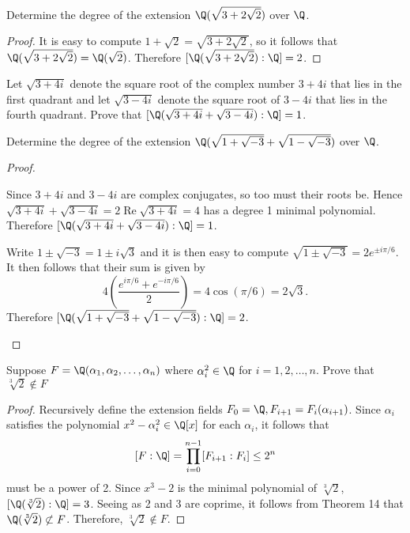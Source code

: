 \documentclass[10pt]{amsart}
\begin{document}
\begin{thm}
  \label{Ex3}
  Determine the degree of the extension $\Q(\sqrt{3 + 2\sqrt{2}})$ over $\Q$.
  
  \begin{proof}
    It is easy to compute $1 + \sqrt{2} = \sqrt{3 + 2\sqrt{2}}$, so it follows that $\Q(\sqrt{3 + 2\sqrt{2}}) = \Q(\sqrt{2})$.
    Therefore $[\Q(\sqrt{3 + 2\sqrt{2}}):\Q] = 2$.
  \end{proof}

  \begin{alphaenum}
    \item
      Let $\sqrt{3 + 4i}$ denote the square root of the complex number $3 + 4i$ that lies in the first quadrant and let $\sqrt{3 - 4i}$ denote the square root of $3 - 4i$ that lies in the fourth quadrant.
      Prove that $[\Q(\sqrt{3 + 4i} + \sqrt{3 - 4i}): \Q] = 1$.
    \item
      Determine the degree of the extension $\Q(\sqrt{1 + \sqrt{-3}} + \sqrt{1 - \sqrt{-3}})$ over $\Q$.
  \end{alphaenum}
  
  \begin{proof}
    \begin{alphaenum}
    \item
      Since $3 + 4i$ and $3 - 4i$ are complex conjugates, so too must their roots be.
      Hence $\sqrt{3 + 4i} + \sqrt{3 - 4i} = 2\operatorname{Re}{\sqrt{3+4i}} = 4$ has a degree 1 minimal polynomial.
      Therefore $[\Q(\sqrt{3 + 4i} + \sqrt{3 - 4i}): \Q] = 1$.
    \item
      Write $1 \pm \sqrt{-3} = 1 \pm i\sqrt{3}$ and it is then easy to compute $\sqrt{1 \pm \sqrt{-3}} = 2e^{\pm i\pi/6}$.
      It then follows that their sum is given by
      $$4\left(\frac{e^{i\pi/6} + e^{-i\pi/6}}{2}\right) = 4\cos(\pi/6) = 2\sqrt{3}.$$
      Therefore $[\Q(\sqrt{1 + \sqrt{-3}} + \sqrt{1 - \sqrt{-3}}):\Q] = 2$.
    \end{alphaenum}
  \end{proof}
\end{thm}

\begin{thm}
  \label{Ex4}
  Suppose $F = \Q(\alpha_1, \alpha_2, \ldots, \alpha_n)$ where $\alpha_i^2 \in \Q$ for $i = 1, 2, \ldots, n$.
  Prove that $\sqrt[3]{2} \not \in F$
  
  \begin{proof}
    Recursively define the extension fields $F_0 = \Q, F_{i+1} = F_i(\alpha_{i+1})$.
    Since  $\alpha_i$ satisfies the polynomial $x^2 - \alpha_i^2 \in \Q[x]$ for each $\alpha_i$, it follows that 
    $$[F:\Q] = \prod_{i=0}^{n-1} [F_{i+1} : F_i] \leq 2^n$$
    must be a power of 2.
    Since $x^3 - 2$ is the minimal polynomial of $\sqrt[3]{2}$, $[\Q(\sqrt[3]{2}):\Q] = 3$.
    Seeing as 2 and 3 are coprime, it follows from Theorem 14 that $\Q(\sqrt[3]{2}) \not \subset F$.
    Therefore, $\sqrt[3]{2} \not \in F.$
    
  \end{proof}
\end{thm}
\end{document}
